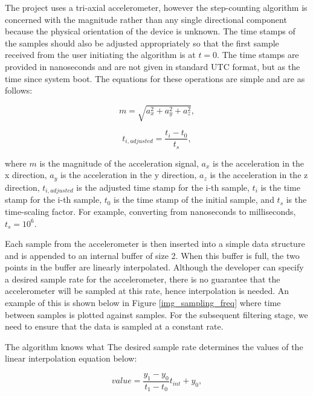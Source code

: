             The project uses a tri-axial accelerometer, however the step-counting algorithm is concerned with the magnitude rather than any single directional component because the physical orientation of the device is unknown. The time stamps of the samples should also be adjusted appropriately so that the first sample received from the user initiating the algorithm is at $t = 0$. The time stamps are provided in nanoseconds and are not given in standard UTC format, but as the time since system boot. The equations for these operations are simple and are as follows:

            \begin{equation}
                m = \sqrt{a_{x}^2 + a_{y}^2 + a_{z}^2},
            \end{equation}

            \begin{equation}
                t_{i,adjusted} = \frac{t_i - t_0}{t_s},
            \end{equation}

            where $m$ is the magnitude of the acceleration signal, $a_{x}$ is the acceleration in the x direction, $a_{y}$ is the acceleration in the y direction, $a_{z}$ is the acceleration in the z direction, $t_{i,adjusted}$ is the adjusted time stamp for the i-th sample, $t_i$ is the time stamp for the i-th sample, $t_0$ is the time stamp of the initial sample, and $t_s$ is the time-scaling factor. For example, converting from nanoseconds to milliseconds, $t_s = 10^6$. 

            Each sample from the accelerometer is then inserted into a simple data structure and is appended to an internal buffer of size 2. When this buffer is full, the two points in the buffer are linearly interpolated. Although the developer can specify a desired sample rate for the accelerometer, there is no guarantee that the accelerometer will be sampled at this rate, hence interpolation is needed. An example of this is shown below in Figure \ref{img_sampling_freq} where time between samples is plotted against samples. For the subsequent filtering stage, we need to ensure that the data is sampled at a constant rate.

            The algorithm knows what The desired sample rate determines the values of the linear interpolation equation below:

            \begin{equation}
                value = \frac{y_1 - y_0}{t_1 - t_0} t_{int} + y_0,
            \end{equation}


